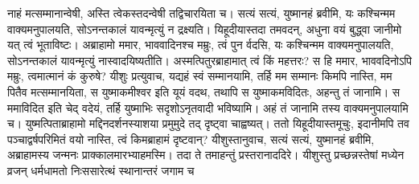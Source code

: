 \vakya नाहं मत्सम्मानान्वेषी, अस्ति त्वेकस्तदन्वेषी तद्विचारयिता च।
\vakya सत्यं सत्यं, युष्मानहं ब्रवीमि, यः कश्चिन्मम वाक्यमनुपालयति, सोऽनन्तकालं यावन्मृत्युं न द्रक्ष्यति।
\vakya यिहूदीयास्तदा तमवदन्, अधुना वयं बुद्ध्वा जानीमो यत् त्वं भूताविष्टः। अब्राहामो ममार, भाववादिनश्च मम्रुः, त्वं पुन र्वदसि, यः कश्चिन्मम वाक्यमनुपालयति, सोऽनन्तकालं यावन्मृत्युं नास्वादयिष्यतीति।
\vakya अस्मत्पितुरब्राहामात् त्वं किं महत्तरः? स हि ममार, भाववदिनोऽपि मम्रुः, त्वमात्मानं कं कुरुषे?
\vakya यीशुः प्रत्युवाच, यद्यहं स्वं सम्मानयामि, तर्हि मम सम्मानः किमपि नास्ति, मम पितैव मत्सम्मानयिता, स युष्माकमीश्वर इति यूयं वदथ,
\vakya तथापि स युष्माकमविदितः, अहन्तु तं जानामि। स ममाविदित इति चेद् वदेयं, तर्हि युष्माभिः सदृशोऽनृतवादी भविष्यामि। अहं तं जानामि तस्य वाक्यमनुपालयामि च।
\vakya युष्मत्पिताब्राहामो मद्दिनदर्शनस्याशया प्रमुमुदे तद् दृष्ट्वा चाह्वष्यत्।
\vakya ततो यिहूदीयास्तमूचुः, इदानीमपि तव पञ्चाद्वर्षपरिमितं वयो नास्ति, त्वं किमब्राहामं दृष्टवान्?
\vakya यीशुस्तानुवाच, सत्यं सत्यं, युष्मानहं ब्रवीमि, अब्राहामस्य जन्मनः प्राक्कालमारभ्याहमस्मि।
\vakya तदा ते तमाहन्तुं प्रस्तरानाददिरे। यीशुस्तु प्रच्छन्नस्तेषां मध्येन व्रजन् धर्मधामतो निःससारेत्थं स्थानान्तरं जगाम च\eoc